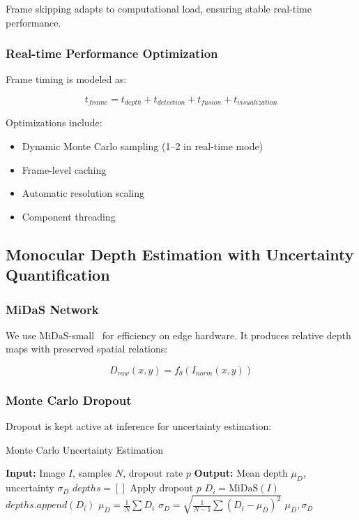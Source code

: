 \documentclass[12pt,oneside]{book}
\begin{document}
Frame skipping adapts to computational load, ensuring stable real-time performance.

\subsubsection{Real-time Performance Optimization}

Frame timing is modeled as:

\begin{equation}
t_{frame} = t_{depth} + t_{detection} + t_{fusion} + t_{visualization}
\label{eq:frame_timing}
\end{equation}

Optimizations include:
\begin{itemize}
\item Dynamic Monte Carlo sampling (1–2 in real-time mode)
\item Frame-level caching
\item Automatic resolution scaling
\item Component threading
\end{itemize}

\subsection{Monocular Depth Estimation with Uncertainty Quantification}

\subsubsection{MiDaS Network}

We use MiDaS-small~\cite{ranftl2020towards} for efficiency on edge hardware. It produces relative depth maps with preserved spatial relations:

\begin{equation}
D_{raw}(x,y) = f_{\theta}(I_{norm}(x,y))
\label{eq:midas_forward}
\end{equation}

\subsubsection{Monte Carlo Dropout}

Dropout is kept active at inference for uncertainty estimation:

\begin{algorithm}
\caption{Monte Carlo Uncertainty Estimation}
\begin{algorithmic}
\STATE \textbf{Input:} Image $I$, samples $N$, dropout rate $p$
\STATE \textbf{Output:} Mean depth $\mu_D$, uncertainty $\sigma_D$
\STATE $depths = []$
    \STATE Apply dropout $p$
    \STATE $D_i = \text{MiDaS}(I)$
    \STATE $depths.append(D_i)$
\ENDFOR
\STATE $\mu_D = \frac{1}{N} \sum D_i$
\STATE $\sigma_D = \sqrt{\frac{1}{N-1} \sum (D_i - \mu_D)^2}$
\RETURN $\mu_D, \sigma_D$
\end{algorithmic}
\end{algorithm}
\end{document}
